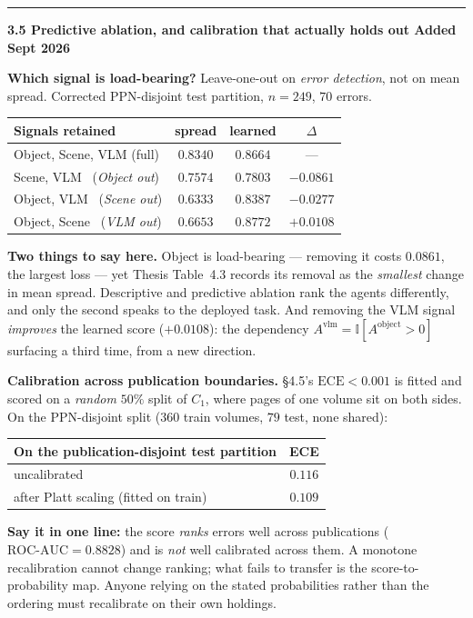 \documentclass[11pt,a4paper]{article}
\newcommand{\status}[1]{\hfill\textcolor{AccentInk}{\small\textbf{#1}}}
\newenvironment{formulacard}[1]
  {\medskip\noindent\rule{\linewidth}{0.6pt}\par\vspace{2pt}\textbf{\large #1}\par\vspace{4pt}}
  {\par\vspace{4pt}}
\newcommand{\notebox}[2]{%
  \par\medskip\noindent
  \colorbox{#1!12}{%
    \begin{minipage}{0.965\linewidth}
    \vspace{2pt}#2\vspace{4pt}
    \end{minipage}%
  }\par\medskip
}
\begin{document}
\begin{formulacard}{3.5 \quad Predictive ablation, and calibration that actually holds out \status{Added Sept 2026}}
\textbf{Which signal is load-bearing?} Leave-one-out on \emph{error detection}, not on mean spread. Corrected PPN-disjoint test partition, $n=249$, $70$ errors.
\begin{center}\small
\begin{tabular}{@{}l c c c@{}}
\toprule
\textbf{Signals retained} & \textbf{spread} & \textbf{learned} & \textbf{$\Delta$} \\
\midrule
Object, Scene, VLM (full) & $0.8340$ & $0.8664$ & --- \\
Scene, VLM \ (\emph{Object out}) & $0.7574$ & $0.7803$ & $-0.0861$ \\
Object, VLM \ (\emph{Scene out}) & $0.6333$ & $0.8387$ & $-0.0277$ \\
Object, Scene \ (\emph{VLM out}) & $0.6653$ & $\mathbf{0.8772}$ & $\mathbf{+0.0108}$ \\
\bottomrule
\end{tabular}
\end{center}
\notebox{GoodInk}{\textbf{Two things to say here.} Object is load-bearing --- removing it costs $0.0861$, the largest loss --- yet Thesis Table~4.3 records its removal as the \emph{smallest} change in mean spread. Descriptive and predictive ablation rank the agents differently, and only the second speaks to the deployed task. And removing the VLM signal \emph{improves} the learned score ($+0.0108$): the dependency $A^{\text{vlm}}=\mathbb{I}[A^{\text{object}}>0]$ surfacing a third time, from a new direction.}

\textbf{Calibration across publication boundaries.} \S4.5's $\text{ECE}<0.001$ is fitted and scored on a \emph{random} $50\%$ split of $C_1$, where pages of one volume sit on both sides. On the PPN-disjoint split ($360$ train volumes, $79$ test, none shared):
\begin{center}\small
\begin{tabular}{@{}l c@{}}
\toprule
\textbf{On the publication-disjoint test partition} & \textbf{ECE} \\
\midrule
uncalibrated & $0.116$ \\
after Platt scaling (fitted on train) & $\mathbf{0.109}$ \\
\bottomrule
\end{tabular}
\end{center}
\notebox{WarnInk}{\textbf{Say it in one line:} the score \emph{ranks} errors well across publications ($\text{ROC-AUC}=0.8828$) and is \emph{not} well calibrated across them. A monotone recalibration cannot change ranking; what fails to transfer is the score-to-probability map. Anyone relying on the stated probabilities rather than the ordering must recalibrate on their own holdings.}


\end{formulacard}
\end{document}
